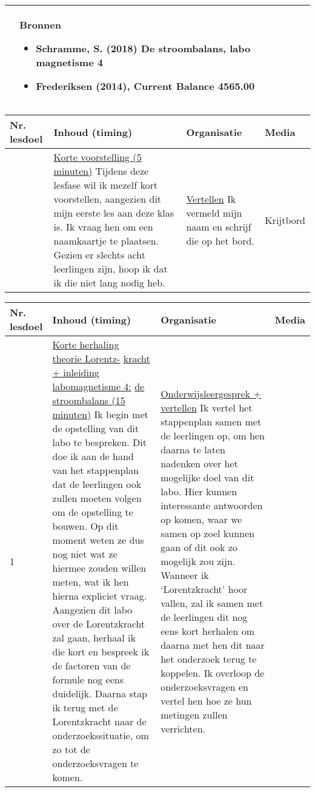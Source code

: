 \begin{landscape}
\begin{tabularx}{1.56\textwidth}{|p{}|X|}
		
		\\ \cline{2-2}
		  & \textbf{Bronnen}\begin{itemize}
		  	\item Schramme, S. (2018) De stroombalans, labo magnetisme 4
		  	\item Frederiksen (2014), Current Balance 4565.00
		  \end{itemize}\\ \hline
	\end{tabularx}


\newpage
	
	\begin{tabularx}{1.56\textwidth}{|p{1.5cm}|p{7cm}|X|p{4cm}|}
		\hline
		\textbf{Nr. lesdoel } & \textbf{Inhoud (timing)}  & \textbf{Organisatie } & \textbf{Media } \\ \hline
		&\underline{Korte voorstelling (5 minuten)}\newline
		Tijdens deze lesfase wil ik mezelf kort voorstellen, aangezien dit mijn eerste les aan deze klas is. Ik vraag hen om een naamkaartje te plaatsen. Gezien er slechts acht leerlingen zijn, hoop ik dat ik die niet lang nodig heb.
		&  \underline{Vertellen}\newline 
		Ik vermeld mijn naam en schrijf die op het bord.
		& Krijtbord 
		\\ \hline
	\end{tabularx}

\begin{tabularx}{1.56\textwidth}{|p{1.5cm}|p{7cm}|X|p{4cm}|}
	\hline
	\textbf{Nr. lesdoel } & \textbf{Inhoud (timing)}  & \textbf{Organisatie } & \textbf{Media } \\ \hline
	1&\underline{Korte herhaling theorie Lorentz-} \underline{kracht + inleiding labomagnetisme 4:} \underline{de stroombalans (15 minuten)}\newline
	Ik begin met de opstelling van dit labo te bespreken. Dit doe ik aan de hand van het stappenplan dat de leerlingen ook zullen moeten volgen om de opstelling te bouwen. Op dit moment weten ze dus nog niet wat ze hiermee zouden willen meten, wat ik hen hierna expliciet vraag. \newline
	Aangezien dit labo over de Lorentzkracht zal gaan, herhaal ik die kort en bespreek ik de factoren van de formule nog eens duidelijk. Daarna stap ik terug met de Lorentzkracht naar de onderzoekssituatie, om zo tot de onderzoeksvragen te komen. 
	&  \underline{Onderwijsleergesprek + vertellen}\newline 
	Ik vertel het stappenplan samen met de leerlingen op, om hen daarna te laten nadenken over het mogelijke doel van dit labo. Hier kunnen interessante antwoorden op komen, waar we samen op zoel kunnen gaan of dit ook zo mogelijk zou zijn. Wanneer ik `Lorentzkracht' hoor vallen, zal ik samen met de leerlingen dit nog eens kort herhalen om daarna met hen dit naar het onderzoek terug te koppelen. 
	Ik overloop de onderzoeksvragen en vertel hen hoe ze hun metingen zullen verrichten.
	

\end{tabularx}
\end{landscape}
